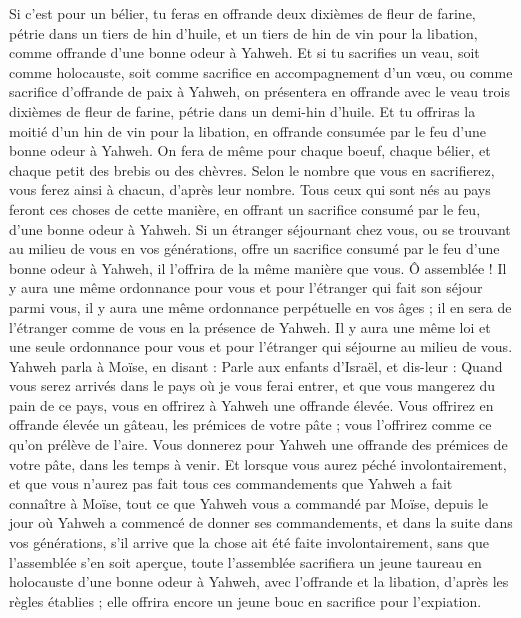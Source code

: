 \begin{multicols}{2}
Si c'est pour un bélier, tu feras en offrande deux dixièmes de fleur de farine, pétrie dans un tiers de hin d'huile,
et un tiers de hin de vin pour la libation, comme offrande d'une bonne odeur à Yahweh.
Et si tu sacrifies un veau, soit comme holocauste, soit comme sacrifice en accompagnement d'un vœu, ou comme sacrifice d'offrande de paix à Yahweh,
on présentera en offrande avec le veau trois dixièmes de fleur de farine, pétrie dans un demi-hin d'huile.
Et tu offriras la moitié d'un hin de vin pour la libation, en offrande consumée par le feu d'une bonne odeur à Yahweh.
On fera de même pour chaque boeuf, chaque bélier, et chaque petit des brebis ou des chèvres.
Selon le nombre que vous en sacrifierez, vous ferez ainsi à chacun, d'après leur nombre.
Tous ceux qui sont nés au pays feront ces choses de cette manière, en offrant un sacrifice consumé par le feu, d'une bonne odeur à Yahweh.
Si un étranger séjournant chez vous, ou se trouvant au milieu de vous en vos générations, offre un sacrifice consumé par le feu d'une bonne odeur à Yahweh, il l'offrira de la même manière que vous.
Ô assemblée ! Il y aura une même ordonnance pour vous et pour l’étranger qui fait son séjour parmi vous, il y aura une même ordonnance perpétuelle en vos âges ; il en sera de l’étranger comme de vous en la présence de Yahweh.
Il y aura une même loi et une seule ordonnance pour vous et pour l'étranger qui séjourne au milieu de vous.
Yahweh parla à Moïse, en disant :
Parle aux enfants d'Israël, et dis-leur : Quand vous serez arrivés dans le pays où je vous ferai entrer,
et que vous mangerez du pain de ce pays, vous en offrirez à Yahweh une offrande élevée.
Vous offrirez en offrande élevée un gâteau, les prémices de votre pâte ; vous l'offrirez comme ce qu'on prélève de l'aire.
Vous donnerez pour Yahweh une offrande des prémices de votre pâte, dans les temps à venir.
Et lorsque vous aurez péché involontairement, et que vous n’aurez pas fait tous ces commandements que Yahweh a fait connaître à Moïse,
tout ce que Yahweh vous a commandé par Moïse, depuis le jour où Yahweh a commencé de donner ses commandements, et dans la suite dans vos générations,
s’il arrive que la chose ait été faite involontairement, sans que l'assemblée s'en soit aperçue, toute l'assemblée sacrifiera un jeune taureau en holocauste d'une bonne odeur à Yahweh, avec l'offrande et la libation, d'après les règles établies ; elle offrira encore un jeune bouc en sacrifice pour l'expiation.

\end{multicols}
